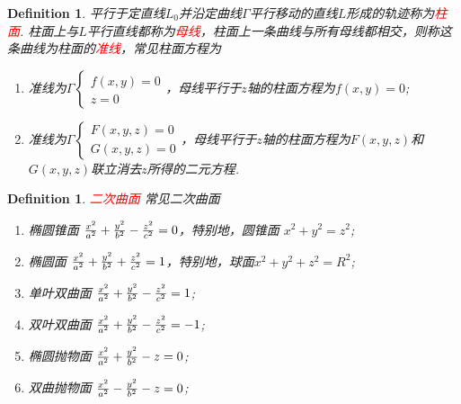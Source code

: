 \documentclass{article}
\newtheorem{definition}[theorem]{Definition}
\newcommand{\redt}[1]{\textcolor{red}{#1}}
\begin{document}
\begin{definition}
\rm 平行于定直线$L_0$并沿定曲线$\Gamma$平行移动的直线$L$形成的轨迹称为\redt{柱面}. 柱面上与$L$平行直线都称为\redt{母线}，柱面上一条曲线与所有母线都相交，则称这条曲线为柱面的\redt{准线}，常见柱面方程为
\begin{enumerate}
	\item 准线为$\Gamma \left\{ \begin{array}{ll} f(x,y) = 0 \\ z = 0 \end{array} \right.$，母线平行于$z$轴的柱面方程为$f(x,y) = 0$;
	\item 准线为$\Gamma \left\{\begin{array}{ll} F(x,y,z) = 0 \\ G(x,y,z) = 0 \end{array}\right.$，母线平行于$z$轴的柱面方程为$F(x,y,z)$和$G(x,y,z)$联立消去$z$所得的二元方程. 
\end{enumerate}
\end{definition}

\begin{definition}
\rm \redt{二次曲面} 常见二次曲面
\begin{enumerate}
	\item 椭圆锥面 ${x^{2} \over a^{2}}+{y^{2} \over b^{2}}-{z^{2} \over c^{2}}=0$，特别地，圆锥面 $x^2 + y^2 = z^2$;
	\item 椭圆面 ${x^{2} \over a^{2}}+{y^{2} \over b^{2}}+{z^{2} \over c^{2}}=1$，特别地，球面$x^2+y^2+z^2 = R^2$;
	\item 单叶双曲面 ${x^{2} \over a^{2}}+{y^{2} \over b^{2}}-{z^{2} \over c^{2}}=1$;
	\item 双叶双曲面 ${x^{2} \over a^{2}}+{y^{2} \over b^{2}}-{z^{2} \over c^{2}}=-1$;
	\item 椭圆抛物面 ${x^{2} \over a^{2}}+{y^{2} \over b^{2}}-z=0$;
	\item 双曲抛物面 ${x^{2} \over a^{2}}-{y^{2} \over b^{2}}-z=0$;
\end{enumerate}
\end{definition}
\end{document}
